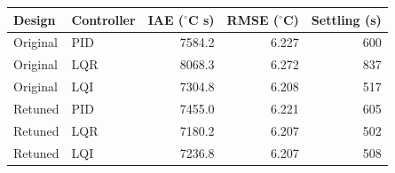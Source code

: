 \begin{tabular}{llrrr}\toprule
Design & Controller & IAE ($^\circ$C s) & RMSE ($^\circ$C) & Settling (s) \\
\midrule
Original & PID & 7584.2 & 6.227 & 600 \\
Original & LQR & 8068.3 & 6.272 & 837 \\
Original & LQI & 7304.8 & 6.208 & 517 \\
Retuned & PID & 7455.0 & 6.221 & 605 \\
Retuned & LQR & 7180.2 & 6.207 & 502 \\
Retuned & LQI & 7236.8 & 6.207 & 508 \\
\bottomrule\end{tabular}
